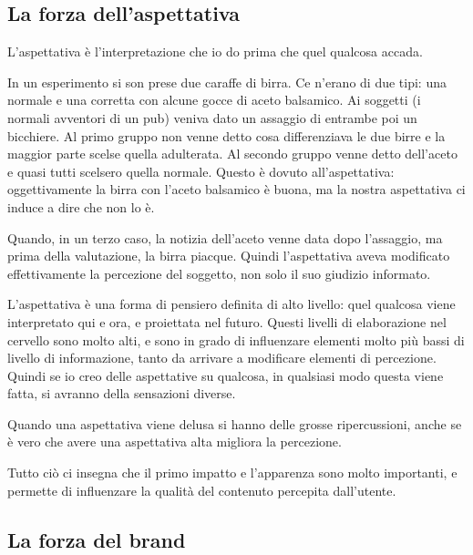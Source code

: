 \subsection{La forza dell'aspettativa}

L'aspettativa è l'interpretazione che io do prima che quel qualcosa accada.

In un esperimento si son prese due caraffe di birra. Ce n'erano di due tipi:
una normale e una corretta con alcune gocce di aceto balsamico. Ai soggetti (i
normali avventori di un pub) veniva dato un assaggio di entrambe poi un
bicchiere.
Al primo gruppo non venne detto cosa differenziava le due birre e la maggior
parte scelse quella adulterata. Al secondo gruppo venne detto dell'aceto e
quasi tutti scelsero quella normale.
Questo è dovuto all'aspettativa: oggettivamente la birra con l'aceto balsamico
è buona, ma la nostra aspettativa ci induce a dire che non lo è.

Quando, in un terzo caso, la notizia dell'aceto venne data dopo l'assaggio, ma
prima della valutazione, la birra piacque.
Quindi l'aspettativa aveva modificato effettivamente la percezione del
soggetto, non solo il suo giudizio informato.

L'aspettativa è una forma di pensiero definita di alto livello: quel qualcosa
viene interpretato qui e ora, e proiettata nel futuro. Questi livelli di
elaborazione nel cervello sono molto alti, e sono in grado di influenzare
elementi molto più bassi di livello di informazione, tanto da arrivare a
modificare elementi di percezione. Quindi se io creo delle aspettative su
qualcosa, in qualsiasi modo questa viene fatta, si avranno della sensazioni
diverse.

Quando una aspettativa viene delusa si hanno delle grosse ripercussioni, anche
se è vero che avere una aspettativa alta migliora la
percezione.



Tutto ciò ci insegna che il primo impatto e l'apparenza sono molto importanti,
e permette di influenzare la qualità del contenuto percepita dall'utente.

\subsection{La forza del brand}

